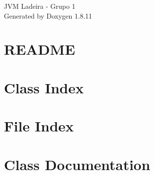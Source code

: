 \documentclass[twoside]{book}
\newcommand{\+}{\discretionary{\mbox{\scriptsize$\hookleftarrow$}}{}{}}
\newcommand{\clearemptydoublepage}{%
  \newpage{\pagestyle{empty}\cleardoublepage}%
}
\begin{document}
\hypersetup{pageanchor=false,
             bookmarksnumbered=true,
             pdfencoding=unicode
            }
\begin{titlepage}
\vspace*{7cm}
\begin{center}%
{\Large J\+VM Ladeira -\/ Grupo 1 }\\
\vspace*{1cm}
{\large Generated by Doxygen 1.8.11}\\
\end{center}
\end{titlepage}
\clearemptydoublepage
\tableofcontents
\clearemptydoublepage
{}
\hypersetup{pageanchor=true}

\chapter{R\+E\+A\+D\+ME}
\label{md_README}
\hypertarget{md_README}{}

\chapter{Class Index}

\chapter{File Index}

\chapter{Class Documentation}





































\end{document}
